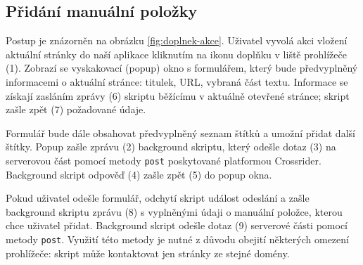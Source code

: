 \subsection{Přidání manuální položky}

Postup je znázorněn na obrázku \ref{fig:doplnek-akce}.
Uživatel vyvolá akci vložení aktuální stránky do naší aplikace kliknutím na ikonu doplňku v liště prohlížeče (1).
Zobrazí se vyskakovací (popup) okno s formulářem, který bude předvyplněný informacemi o aktuální stránce: titulek, URL, vybraná část textu.
Informace se získají zasláním zprávy (6) skriptu běžícímu v aktuálně otevřené stránce; skript zašle zpět (7) požadované údaje.

Formulář bude dále obsahovat předvyplněný seznam štítků a umožní přidat další štítky.
Popup zašle zprávu (2) background skriptu, který odešle dotaz (3) na serverovou část pomocí metody \verb|post| poskytované platformou Crossrider.
Background skript odpověď (4) zašle zpět (5) do popup okna.

Pokud uživatel odešle formulář, odchytí skript událost odeslání a zašle background skriptu zprávu (8) s vyplněnými údaji o manuální položce, kterou chce uživatel přidat.
Background skript odešle dotaz (9) serverové části pomocí metody \verb|post|.
Využití této metody je nutné z důvodu obejití některých omezení prohlížeče: skript může kontaktovat jen stránky ze stejné domény.
